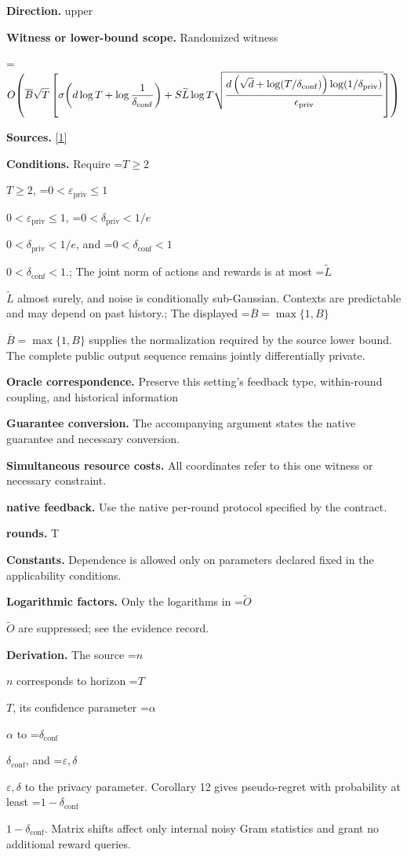 \documentclass[10pt,a4paper]{article}
\newcommand{\AtlasMath}[1]{\par\begingroup\centering\setbox0=\hbox{$\displaystyle #1$}\ifdim\wd0>1.4\linewidth\typeout{ATLAS WIDE FORMULA: \the\wd0}\fi\ifdim\wd0>\linewidth\resizebox{\linewidth}{!}{\box0}\else\box0\fi\par\endgroup}
\newcommand{\AtlasInlineMath}[1]{\begingroup\setbox0=\hbox{$#1$}\ifdim\wd0>.4\linewidth\endgroup\AtlasMath{#1}\else\endgroup$#1$\fi}
\begin{document}
\textbf{Direction.} upper

\textbf{Witness or lower-bound scope.} Randomized witness

\AtlasMath{O\!\left(\overline B\sqrt T\left[\sigma\!\left(d\log T+\log\frac1{\delta_{\rm conf}}\right)+S\widetilde{L}\log T\sqrt{\frac{d\left(\sqrt d+\log(T/\delta_{\rm conf})\right)\log(1/\delta_{\rm priv})}{\epsilon_{\rm priv}}}\right]\right)}
\textbf{Sources.} \href{https://arxiv.org/abs/1810.00068}{[1]}

\textbf{Conditions.} Require \AtlasInlineMath{T\ge2}, \AtlasInlineMath{0<\varepsilon_{\mathrm{priv}}\le1}, \AtlasInlineMath{0<\delta_{\mathrm{priv}}<1/e}, and \AtlasInlineMath{0<\delta_{\mathrm{conf}}<1}.; The joint norm of actions and rewards is at most \AtlasInlineMath{\widetilde L} almost surely, and noise is conditionally sub-Gaussian. Contexts are predictable and may depend on past history.; The displayed \AtlasInlineMath{\overline B=\max\{1,B\}} supplies the normalization required by the source lower bound. The complete public output sequence remains jointly differentially private.

\textbf{Oracle correspondence.} Preserve this setting's feedback type, within-round coupling, and historical information

\textbf{Guarantee conversion.} The accompanying argument states the native guarantee and necessary conversion.

\textbf{Simultaneous resource costs.} All coordinates refer to this one witness or necessary constraint.

\textbf{native feedback.} Use the native per-round protocol specified by the contract.

\textbf{rounds.} T

\textbf{Constants.} Dependence is allowed only on parameters declared fixed in the applicability conditions.

\textbf{Logarithmic factors.} Only the logarithms in \AtlasInlineMath{\widetilde O} are suppressed; see the evidence record.

\textbf{Derivation.} The source \AtlasInlineMath{n} corresponds to horizon \AtlasInlineMath{T}, its confidence parameter \AtlasInlineMath{\alpha} to \AtlasInlineMath{\delta_{\mathrm{conf}}}, and \AtlasInlineMath{\varepsilon,\delta} to the privacy parameter. Corollary 12 gives pseudo-regret with probability at least \AtlasInlineMath{1-\delta_{\mathrm{conf}}}. Matrix shifts affect only internal noisy Gram statistics and grant no additional reward queries.
\end{document}
